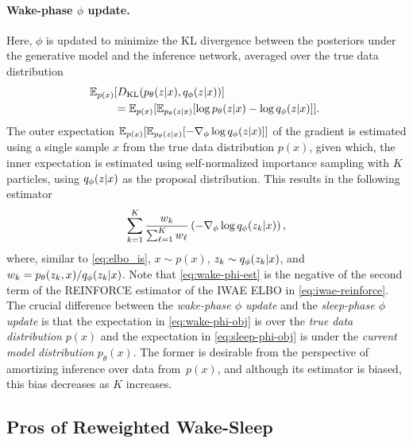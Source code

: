 \paragraph{Wake-phase $\phi$ update.}%
\hspace*{-0.5ex}Here, \(\phi\) is updated to minimize the \gls{KL} divergence between the posteriors under the generative model and the inference network, averaged over the true data distribution
\begin{align}
  \hspace*{-0.35em}
  \mathbb{E}_{p(x)}&[D_{\mathrm{KL}}(p_\theta(z \lvert x), q_\phi(z \lvert x))] \nonumber \\
  &= \mathbb{E}_{p(x)}[\mathbb{E}_{p_\theta(z \lvert x)}[\log p_\theta(z \lvert x) - \log q_\phi(z \lvert x)]]. \label{eq:wake-phi-obj}
\end{align}
The outer expectation $\mathbb{E}_{p(x)}[\mathbb{E}_{p_\theta(z \lvert x)}[-\nabla_\phi \log q_\phi(z \lvert x)]]$ of the gradient is estimated using a single sample $x$ from the true data distribution $p(x)$, given which, the inner expectation is estimated using self-normalized importance sampling with $K$ particles, using $q_\phi(z \lvert x)$ as the proposal distribution.
This results in the following estimator
\begin{align}
  \sum_{k = 1}^K \frac{w_k}{\sum_{\ell = 1}^K w_\ell} \left(-\nabla_\phi \log q_\phi(z_k \lvert x)\right), \label{eq:wake-phi-est}
\end{align}
where, similar to \cref{eq:elbo_is}, $x \sim p(x)$, $z_k \sim q_\phi(z_k \lvert x)$, and $w_k = p_\theta(z_k, x) / q_\phi(z_k \lvert x)$.
Note that \cref{eq:wake-phi-est} is the negative of the second term of the \acrshort{REINFORCE} estimator of the \gls{IWAE} \gls{ELBO} in \cref{eq:iwae-reinforce}.
The crucial difference between the \emph{wake-phase $\phi$ update} and the \emph{sleep-phase $\phi$ update} is that the expectation in \cref{eq:wake-phi-obj} is over the \emph{true data distribution} $p(x)$ and the expectation in \cref{eq:sleep-phi-obj} is under the \emph{current model distribution} $p_\theta(x)$.
The former is desirable from the perspective of amortizing inference over data from~\(p(x)\), and although its estimator is biased, this bias decreases as $K$ increases.


\subsection{Pros of Reweighted Wake-Sleep}

